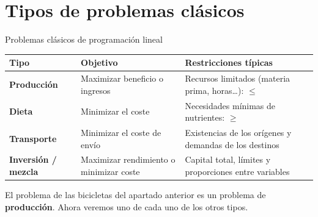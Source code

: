 \documentclass[11pt,a4paper]{article}
\begin{document}
\section{Tipos de problemas clásicos}\hypertarget{sec4}{}

\begin{fmprop}{Problemas clásicos de programación lineal}
\begin{center}\renewcommand{\arraystretch}{1.5}\small\begin{tabularx}{\linewidth}{>{\raggedright\arraybackslash}p{3.2cm}>{\raggedright\arraybackslash}X>{\raggedright\arraybackslash}X}\toprule
\textbf{Tipo} & \textbf{Objetivo} & \textbf{Restricciones típicas}\\\midrule
\textbf{Producción} & Maximizar beneficio o ingresos & Recursos limitados (materia prima, horas\dots{}): $\leq$\\[3pt]
\textbf{Dieta} & Minimizar el coste & Necesidades mínimas de nutrientes: $\geq$\\[3pt]
\textbf{Transporte} & Minimizar el coste de envío & Existencias de los orígenes y demandas de los destinos\\[3pt]
\textbf{Inversión / mezcla} & Maximizar rendimiento o minimizar coste & Capital total, límites y proporciones entre variables\\[3pt]
\bottomrule\end{tabularx}\end{center}

\begin{fmnote}El problema de las bicicletas del apartado anterior es un problema de \textbf{producción}. Ahora veremos uno de cada uno de los otros tipos.\end{fmnote}
\end{fmprop}
\end{document}
